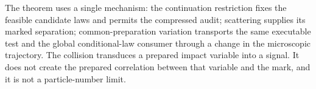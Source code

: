 The theorem uses a single mechanism: the continuation restriction fixes
the feasible candidate laws and permits the compressed audit; scattering
supplies its marked separation; common-preparation variation transports the
same executable test and the global conditional-law consumer through a
change in the microscopic trajectory. The collision transduces a prepared
impact variable into a signal. It does not create the prepared correlation
between that variable and the mark, and it is not a particle-number limit.
